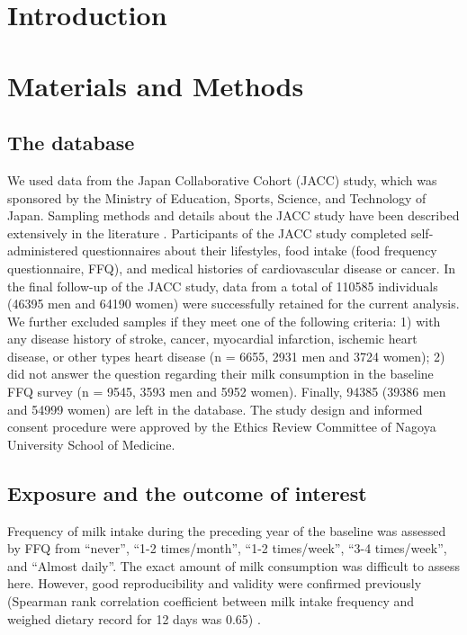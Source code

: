 \documentclass[nutrients,article,submit,moreauthors,pdftex]{mdpi}
\begin{document}

\hypertarget{introduction}{%
\section{Introduction}\label{introduction}}

\hypertarget{materials-and-methods}{%
\section{Materials and Methods}\label{materials-and-methods}}

\hypertarget{the-database}{%
\subsection{The database}\label{the-database}}

We used data from the Japan Collaborative Cohort (JACC) study, which was
sponsored by the Ministry of Education, Sports, Science, and Technology
of Japan. Sampling methods and details about the JACC study have been
described extensively in the literature
\citep{Ohno2001, Tamakoshi2005, Tamakoshi2013}. Participants of the JACC
study completed self-administered questionnaires about their lifestyles,
food intake (food frequency questionnaire, FFQ), and medical histories
of cardiovascular disease or cancer. In the final follow-up of the JACC
study, data from a total of 110585 individuals (46395 men and 64190
women) were successfully retained for the current analysis. We further
excluded samples if they meet one of the following criteria: 1) with any
disease history of stroke, cancer, myocardial infarction, ischemic heart
disease, or other types heart disease (n = 6655, 2931 men and 3724
women); 2) did not answer the question regarding their milk consumption
in the baseline FFQ survey (n = 9545, 3593 men and 5952 women). Finally,
94385 (39386 men and 54999 women) are left in the database. The study
design and informed consent procedure were approved by the Ethics Review
Committee of Nagoya University School of Medicine.

\hypertarget{exposure-and-the-outcome-of-interest}{%
\subsection{Exposure and the outcome of
interest}\label{exposure-and-the-outcome-of-interest}}

Frequency of milk intake during the preceding year of the baseline was
assessed by FFQ from ``never'', ``1-2 times/month'', ``1-2 times/week'',
``3-4 times/week'', and ``Almost daily''. The exact amount of milk
consumption was difficult to assess here. However, good reproducibility
and validity were confirmed previously (Spearman rank correlation
coefficient between milk intake frequency and weighed dietary record for
12 days was 0.65) \citep{Date2005}.
\end{document}
